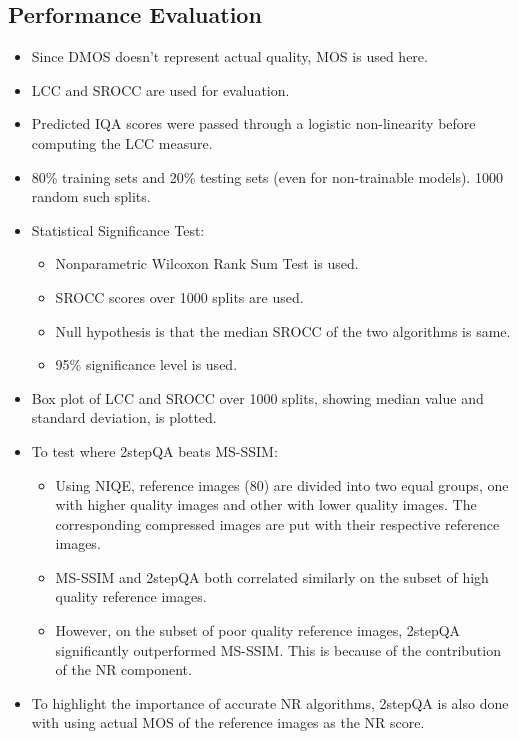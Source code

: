 \documentclass{article}
\begin{document}
    \subsection{Performance Evaluation}\label{subsec:Predicting_the_Quality_of_Images_Compressed_After_Distortion_in_Two_Steps:performance-evaluation}
    \begin{itemize}
        \item Since DMOS doesn't represent actual quality, MOS is used here.
        \item LCC and SROCC are used for evaluation.
        \item Predicted IQA scores were passed through a logistic non-linearity before computing the LCC measure.
        \item 80\% training sets and 20\% testing sets (even for non-trainable models).
        1000 random such splits.
        \item Statistical Significance Test:
        \begin{itemize}
            \item Nonparametric Wilcoxon Rank Sum Test is used.
            \item SROCC scores over 1000 splits are used.
            \item Null hypothesis is that the median SROCC of the two algorithms is same.
            \item 95\% significance level is used.
        \end{itemize}
        \item Box plot of LCC and SROCC over 1000 splits, showing median value and standard deviation, is plotted.
        \item To test where 2stepQA beats MS-SSIM:
        \begin{itemize}
            \item Using NIQE, reference images (80) are divided into two equal groups, one with higher quality images and other with lower quality images.
            The corresponding compressed images are put with their respective reference images.
            \item MS-SSIM and 2stepQA both correlated similarly on the subset of high quality reference images.
            \item However, on the subset of poor quality reference images, 2stepQA significantly outperformed MS-SSIM\@.
            This is because of the contribution of the NR component.
        \end{itemize}
        \item To highlight the importance of accurate NR algorithms, 2stepQA is also done with using actual MOS of the reference images as the NR score.

\end{itemize}
\end{document}
